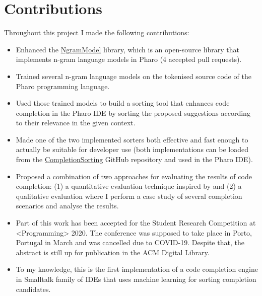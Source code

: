 \section{Contributions}
\label{sec:Introduction-Contributions}
Throughout this project I made the following contributions:
\begin{itemize}
    \item Enhanced the \href{https://github.com/pharo-ai/NgramModel}{NgramModel} library, which is an open-source library that implements n-gram language models in Pharo (4 accepted pull requests).
    \item Trained several n-gram language models on the tokenised source code of the Pharo programming language.
    \item Used those trained models to build a sorting tool that enhances code completion in the Pharo IDE by sorting the proposed suggestions according to their relevance in the given context.
    \item Made one of the two implemented sorters both effective and fast enough to actually be suitable for developer use (both implementations can be loaded from the \href{https://github.com/myroslavarm/CompletionSorting}{CompletionSorting} GitHub repository and used in the Pharo IDE).
    \item Proposed a combination of two approaches for evaluating the results of code completion: (1) a quantitative evaluation technique inspired by \cite{Robb08a} and (2) a qualitative evaluation where I perform a case study of several completion scenarios and analyse the results.
    \item Part of this work has been accepted for the Student Research Competition at <Programming> 2020. The conference was supposed to take place in Porto, Portugal in March and was cancelled due to COVID-19. Despite that, the abstract is still up for publication in the ACM Digital Library.
    \item To my knowledge, this is the first implementation of a code completion engine in Smalltalk family of IDEs that uses machine learning for sorting completion candidates.
\end{itemize}

